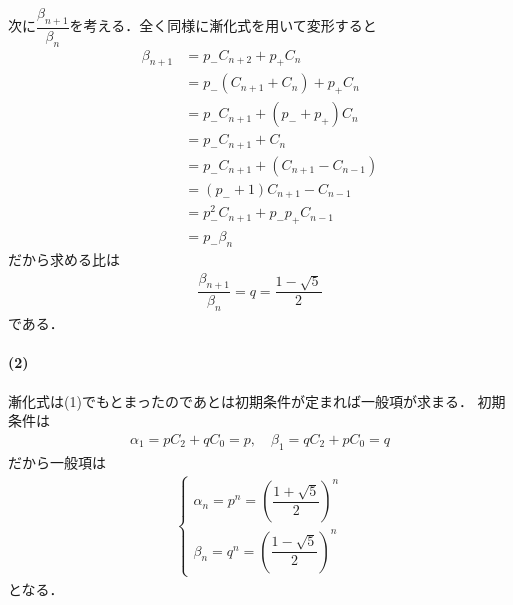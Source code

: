 \documentclass[../../main.tex]{subfiles}
\begin{document}
次に$\dfrac{\beta_{n+1}}{\beta_n}$を考える．全く同様に漸化式を用いて変形すると
\begin{align}
  \beta_{n+1}
  &= p_{-} C_{n+2} + p_{+} C_{n} \\
  &= p_{-} \left(C_{n+1}+C_{n}\right) + p_{+} C_{n} \\
  &= p_{-} C_{n+1}+\left(p_{-}+p_{+}\right)C_{n} \\
  &= p_{-} C_{n+1}+C_{n} \\
  &= p_{-} C_{n+1}+ \left(C_{n+1}-C_{n-1}\right) \\
  &= \left(p_{-}+1\right) C_{n+1} - C_{n-1} \\
  &= p_{-}^2 C_{n+1} + p_{-}p_{+} C_{n-1} \\
  &= p_{-} \beta_{n}
\end{align}
だから求める比は
\begin{align}
  \dfrac{\beta_{n+1}}{\beta_n} = q = \dfrac{1-\sqrt{5}}{2}
\end{align}
である．

\paragraph{(2)}
漸化式は(1)でもとまったのであとは初期条件が定まれば一般項が求まる．
初期条件は
\begin{align}
  \alpha_1 = p C_2 + q C_0 = p, \quad \beta_1 = q C_2 + p C_0 = q
\end{align}
だから一般項は
\begin{align}
  \begin{cases}
    \alpha_n = p^n = \left( \dfrac{1+\sqrt{5}}{2} \right)^n \\
    \beta_n = q^n = \left( \dfrac{1-\sqrt{5}}{2} \right)^n
  \end{cases}
\end{align}
となる．
\end{document}
